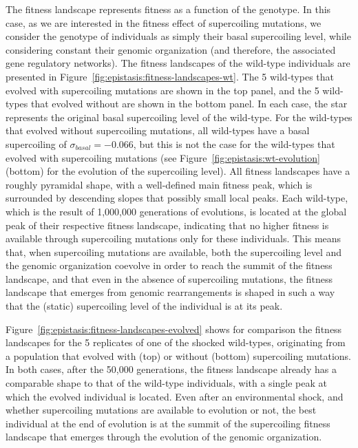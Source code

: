 The fitness landscape represents fitness as a function of the genotype.
In this case, as we are interested in the fitness effect of supercoiling mutations, we consider the genotype of individuals as  simply their basal supercoiling level, while considering constant their genomic organization (and therefore, the associated gene regulatory networks).
The fitness landscapes of the wild-type individuals are presented in Figure~\ref{fig:epistasis:fitness-landscapes-wt}.
The 5 wild-types that evolved with supercoiling mutations are shown in the top panel, and the 5 wild-types that evolved without are shown in the bottom panel.
In each case, the star represents the original basal supercoiling level of the wild-type.
For the wild-types that evolved without supercoiling mutations, all wild-types have a basal supercoiling of $\sigma_{basal} = -0.066$, but this is not the case for the wild-types that evolved with supercoiling mutations (see Figure~\ref{fig:epistasis:wt-evolution} (bottom) for the evolution of the supercoiling level).
All fitness landscapes have a roughly pyramidal shape, with a well-defined main fitness peak, which is surrounded by descending slopes that possibly small local peaks.
Each wild-type, which is the result of 1,000,000 generations of evolutions, is located at the global peak of their respective fitness landscape, indicating that no higher fitness is available through supercoiling mutations only for these individuals.
This means that, when supercoiling mutations are available, both the supercoiling level and the genomic organization coevolve in order to reach the summit of the fitness landscape, and that even in the absence of supercoiling mutations, the fitness landscape that emerges from genomic rearrangements is shaped in such a way that the (static) supercoiling level of the individual is at its peak.

Figure~\ref{fig:epistasis:fitness-landscapes-evolved} shows for comparison the fitness landscapes for the 5 replicates of one of the shocked wild-types, originating from a population that evolved with (top) or without (bottom) supercoiling mutations.
In both cases, after the 50,000 generations, the fitness landscape already has a comparable shape to that of the wild-type individuals, with a single peak at which the evolved individual is located.
Even after an environmental shock, and whether supercoiling mutations are available to evolution or not, the best individual at the end of evolution is at the summit of the supercoiling fitness landscape that emerges through the evolution of the genomic organization.

